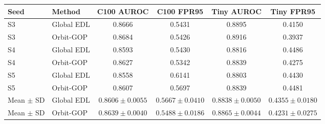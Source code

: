 \begingroup
\footnotesize
\setlength{\tabcolsep}{3pt}
\renewcommand{\arraystretch}{1.1}
\begin{longtable}{@{}llcccc@{}}
\toprule
Seed & Method & C100 AUROC & C100 FPR95 & Tiny AUROC & Tiny FPR95 \\
\midrule
\endhead
\bottomrule
\endlastfoot
S3 & Global EDL & 0.8666 & 0.5431 & 0.8895 & 0.4150 \\
S3 & Orbit-GOP & 0.8684 & 0.5426 & 0.8916 & 0.3937 \\
S4 & Global EDL & 0.8593 & 0.5430 & 0.8816 & 0.4486 \\
S4 & Orbit-GOP & 0.8627 & 0.5342 & 0.8839 & 0.4275 \\
S5 & Global EDL & 0.8558 & 0.6141 & 0.8803 & 0.4430 \\
S5 & Orbit-GOP & 0.8607 & 0.5697 & 0.8839 & 0.4481 \\
Mean $\pm$ SD & Global EDL & $0.8606 \pm 0.0055$ & $0.5667 \pm 0.0410$ & $0.8838 \pm 0.0050$ & $0.4355 \pm 0.0180$ \\
Mean $\pm$ SD & Orbit-GOP & $0.8639 \pm 0.0040$ & $0.5488 \pm 0.0186$ & $0.8865 \pm 0.0044$ & $0.4231 \pm 0.0275$ \\
\end{longtable}
\endgroup
